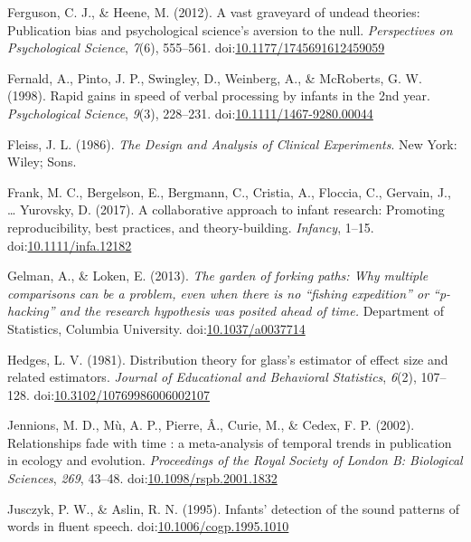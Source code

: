 \documentclass[man]{apa6}
\theoremstyle{definition}
\theoremstyle{definition}
\theoremstyle{definition}
\theoremstyle{remark}
\begin{document}
\hypertarget{ref-Ferguson2012}{}
Ferguson, C. J., \& Heene, M. (2012). A vast graveyard of undead
theories: Publication bias and psychological science's aversion to the
null. \emph{Perspectives on Psychological Science}, \emph{7}(6),
555--561.
doi:\href{https://doi.org/10.1177/1745691612459059}{10.1177/1745691612459059}

\hypertarget{ref-Fernald1998}{}
Fernald, A., Pinto, J. P., Swingley, D., Weinberg, A., \& McRoberts, G.
W. (1998). Rapid gains in speed of verbal processing by infants in the
2nd year. \emph{Psychological Science}, \emph{9}(3), 228--231.
doi:\href{https://doi.org/10.1111/1467-9280.00044}{10.1111/1467-9280.00044}

\hypertarget{ref-Fleiss1986}{}
Fleiss, J. L. (1986). \emph{The Design and Analysis of Clinical
Experiments}. New York: Wiley; Sons.

\hypertarget{ref-Frank2017}{}
Frank, M. C., Bergelson, E., Bergmann, C., Cristia, A., Floccia, C.,
Gervain, J., \ldots{} Yurovsky, D. (2017). A collaborative approach to
infant research: Promoting reproducibility, best practices, and
theory-building. \emph{Infancy}, 1--15.
doi:\href{https://doi.org/10.1111/infa.12182}{10.1111/infa.12182}

\hypertarget{ref-Gelman2013}{}
Gelman, A., \& Loken, E. (2013). \emph{The garden of forking paths: Why
multiple comparisons can be a problem, even when there is no ``fishing
expedition'' or ``p-hacking'' and the research hypothesis was posited
ahead of time.} Department of Statistics, Columbia University.
doi:\href{https://doi.org/10.1037/a0037714}{10.1037/a0037714}

\hypertarget{ref-Hedges1981}{}
Hedges, L. V. (1981). Distribution theory for glass's estimator of
effect size and related estimators. \emph{Journal of Educational and
Behavioral Statistics}, \emph{6}(2), 107--128.
doi:\href{https://doi.org/10.3102/10769986006002107}{10.3102/10769986006002107}

\hypertarget{ref-Jennions2002}{}
Jennions, M. D., Mù, A. P., Pierre, Â., Curie, M., \& Cedex, F. P.
(2002). Relationships fade with time : a meta-analysis of temporal
trends in publication in ecology and evolution. \emph{Proceedings of the
Royal Society of London B: Biological Sciences}, \emph{269}, 43--48.
doi:\href{https://doi.org/10.1098/rspb.2001.1832}{10.1098/rspb.2001.1832}

\hypertarget{ref-Jusczyk1995}{}
Jusczyk, P. W., \& Aslin, R. N. (1995). Infants' detection of the sound
patterns of words in fluent speech.
doi:\href{https://doi.org/10.1006/cogp.1995.1010}{10.1006/cogp.1995.1010}
\end{document}
